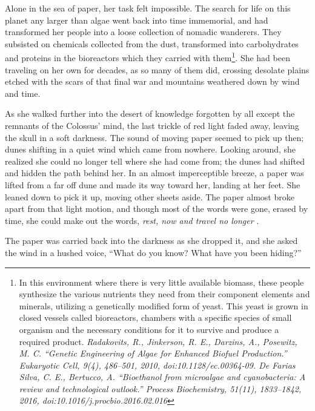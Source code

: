 \documentclass[12pt]{article}
\begin{document}
\begin{flushleft}
Alone in the sea of paper, her task felt impossible. The search for life on this planet any larger than algae went back into time immemorial, and had transformed her people into a loose collection of nomadic wanderers. They subsisted on chemicals collected from the dust, transformed into carbohydrates and proteins in the bioreactors which they carried with them\footnote{In this environment where there is very little available biomass, these people synthesize the various nutrients they need from their component elements and minerals, utilizing a genetically modified form of yeast. This yeast is grown in closed vessels called bioreactors, chambers with a specific species of small organism and the necessary conditions for it to survive and produce a required product.\linebreak
\textit{Radakovits, R., Jinkerson, R. E., Darzins, A., Posewitz, M. C. “Genetic Engineering of Algae for Enhanced Biofuel Production.” Eukaryotic Cell, 9(4), 486–501, 2010, doi:10.1128/ec.00364-09.\linebreak
De Farias Silva, C. E., Bertucco, A. “Bioethanol from microalgae and cyanobacteria: A review and technological outlook.” Process Biochemistry, 51(11), 1833–1842, 2016, doi:10.1016/j.procbio.2016.02.016}}. She had been traveling on her own for decades, as so many of them did, crossing desolate plains etched with the scars of that final war and mountains weathered down by wind and time.

As she walked further into the desert of knowledge forgotten by all except the remnants of the Colossus' mind, the last trickle of red light faded away, leaving the skull in a soft darkness. The sound of moving paper seemed to pick up then; dunes shifting in a quiet wind which came from nowhere. Looking around, she realized she could no longer tell where she had come from; the dunes had shifted and hidden the path behind her. In an almost imperceptible breeze, a paper was lifted from a far off dune and made its way toward her, landing at her feet. She leaned down to pick it up, moving other sheets aside. The paper almost broke apart from that light motion, and though most of the words were gone, erased by time, she could make out the words, \textit{       rest, now          and travel           no longer         }.

The paper was carried back into the darkness as she dropped it, and she asked the wind in a hushed voice, “What do you know? What have you been hiding?”


\end{flushleft}
\end{document}
